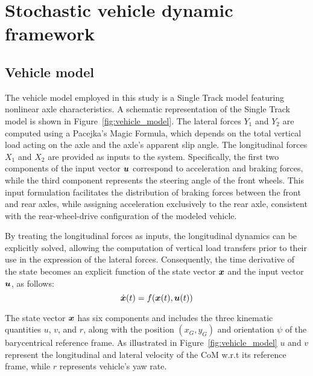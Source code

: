 \section{Stochastic vehicle dynamic framework}
\label{sec:svdf}

\subsection{Vehicle model}
\label{sec:vehicle_model}
The vehicle model employed in this study is a Single Track model featuring nonlinear axle characteristics. A schematic representation of the Single Track model is shown in Figure~\ref{fig:vehicle_model}. The lateral forces $Y_1$ and $Y_2$ are computed using a Pacejka's Magic Formula, which depends on the total vertical load acting on the axle and the axle's apparent slip angle.
The longitudinal forces $X_1$ and $X_2$ are provided as inputs to the system. Specifically, the first two components of the input vector $\boldsymbol{u}$ correspond to acceleration and braking forces, while the third component represents the steering angle of the front wheels. This input formulation facilitates the distribution of braking forces between the front and rear axles, while assigning acceleration exclusively to the rear axle, consistent with the rear-wheel-drive configuration of the modeled vehicle.

By treating the longitudinal forces as inputs, the longitudinal dynamics can be explicitly solved, allowing the computation of vertical load transfers prior to their use in the expression of the lateral forces. Consequently, the time derivative of the state becomes an explicit function of the state vector $\boldsymbol{x}$ and the input vector $\boldsymbol{u}$, as follows:
\begin{equation}
	\dot{\boldsymbol{x}}(t) = f(\boldsymbol{x}(t), \boldsymbol{u}(t))
\end{equation}

The state vector $\boldsymbol{x}$ has six components and includes the three kinematic quantities $u$, $v$, and $r$, along with the position $\left(x_G, y_G\right)$ and orientation $\psi$ of the barycentrical reference frame. As illustrated in Figure~\ref{fig:vehicle_model} $u$ and $v$ represent the longitudinal and lateral velocity of the CoM w.r.t its reference frame, while $r$ represents vehicle's yaw rate.

